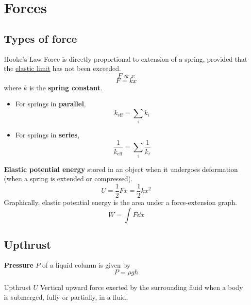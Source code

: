 \section{Forces}
\subsection{Types of force}
\begin{defn}{Hooke's Law}{}
Force is directly proportional to extension of a spring, provided that the \underline{elastic limit} has not been exceeded.
\[ F \propto x \]
\begin{equation} F = kx \end{equation}
where $k$ is the \textbf{spring constant}.
\end{defn}

\begin{itemize}
\item For springs in \textbf{parallel}, 
\begin{equation} k_{\text{eff}} = \sum_{i} k_i \end{equation}
\item For springs in \textbf{series},
\begin{equation} \frac{1}{k_{\text{eff}}} = \sum_{i} \frac{1}{k_i} \end{equation}
\end{itemize}

\textbf{Elastic potential energy} stored in an object when it undergoes deformation (when a spring is extended or compressed).
\begin{equation} U = \frac{1}{2}Fx = \frac{1}{2}kx^2 \end{equation}
Graphically, elastic potential energy is the area under a force-extension graph.
\[ W = \int F \dd{x} \]

\subsection{Upthrust}
\textbf{Pressure} $P$ of a liquid column is given by 
\begin{equation}
P=\rho gh
\end{equation}


\begin{defn}{Upthrust $U$}{}
Vertical upward force exerted by the surrounding fluid when a body is submerged, fully or partially, in a fluid.
\end{defn} 

